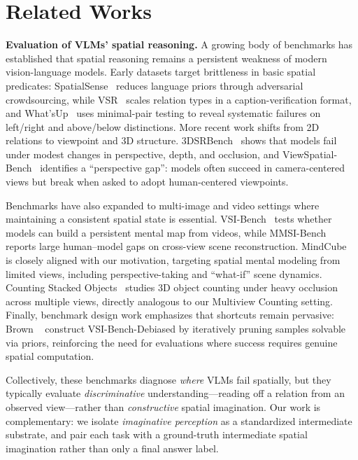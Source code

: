 \section{Related Works}
\label{sec:rw}

\noindent\textbf{Evaluation of VLMs' spatial reasoning.}
A growing body of benchmarks has established that spatial reasoning remains a persistent weakness of modern vision-language models. Early datasets target brittleness in basic spatial predicates: SpatialSense~\cite{yang2019spatialsense} reduces language priors through adversarial crowdsourcing, while VSR~\cite{liu2022vsr} scales relation types in a caption-verification format, and What'sUp~\cite{kamath2023whatsup} uses minimal-pair testing to reveal systematic failures on left/right and above/below distinctions. More recent work shifts from 2D relations to viewpoint and 3D structure. 3DSRBench~\cite{ma20253dsrbench} shows that models fail under modest changes in perspective, depth, and occlusion, and ViewSpatial-Bench~\cite{li2025viewspatialbench} identifies a ``perspective gap'': models often succeed in camera-centered views but break when asked to adopt human-centered viewpoints.

Benchmarks have also expanded to multi-image and video settings where maintaining a consistent spatial state is essential. VSI-Bench~\cite{yang2025thinkinginspace} tests whether models can build a persistent mental map from videos, while MMSI-Bench~\cite{yang2025mmsibench} reports large human--model gaps on cross-view scene reconstruction. MindCube~\cite{yin2025mindcube} is closely aligned with our motivation, targeting spatial mental modeling from limited views, including perspective-taking and ``what-if'' scene dynamics. Counting Stacked Objects~\cite{dumery2025countingstackedobjects} studies 3D object counting under heavy occlusion across multiple views, directly analogous to our Multiview Counting setting. Finally, benchmark design work emphasizes that shortcuts remain pervasive: Brown \etal~\cite{brown2025trainontestset} construct VSI-Bench-Debiased by iteratively pruning samples solvable via priors, reinforcing the need for evaluations where success requires genuine spatial computation.

Collectively, these benchmarks diagnose \emph{where} VLMs fail spatially, but they typically evaluate \emph{discriminative} understanding---reading off a relation from an observed view---rather than \emph{constructive} spatial imagination. Our work is complementary: we isolate \emph{imaginative perception} as a standardized intermediate substrate, and pair each task with a ground-truth intermediate spatial imagination rather than only a final answer label.


